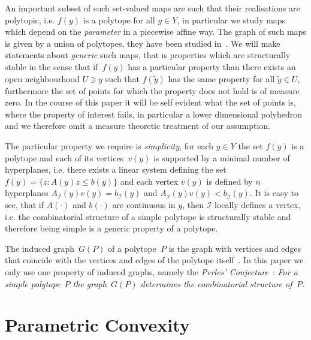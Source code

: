 \documentclass{elsarticle}
\theoremstyle{remark}
\theoremstyle{definition}
\begin{document}
An important subset of such set-valued maps are such that their realisations are polytopic, i.e. $f(y)$ is a polytope for all $y\in Y$, in particular we study maps which depend on the \emph{parameter} in a piecewise affine way.
%
The graph of such maps is given by a union of polytopes, they have been studied in~\cite{Finzel:2000}.
%
We will make statements about \emph{generic} such maps, that is properties which are structurally stable in the sense that if~$f(y)$ has a particular property than there exists an open neighbourhood $U\ni y$ such that $f(\tilde y)$ has the same property for all $\tilde y\in U$, furthermore the set of points for which the property does not hold is of measure zero.
%
In the course of this paper it will be self evident what the set of points is, where the property of interest fails, in particular a lower dimensional polyhedron and we therefore omit a measure theoretic treatment of our assumption.

The particular property we require is \emph{simplicity}, for each $y\in Y$ the set $f(y)$ is a polytope and each of its vertices~$v(y)$ is supported by a minimal number of hyperplanes, i.e. there exists a linear system defining the set~$f(y) = \{z:A(y)z\leq b(y)\}$ and each vertex $v(y)$ is defined by $n$ hyperplanes $A_{\mathcal I}(y)v(y)=b_{\mathcal I}(y)$ and $A_{\bar{\mathcal I}}(y)v(y)<b_{\bar{\mathcal I}}(y)$.
%
It is easy to see, that if $A(\cdot)$ and $b(\cdot)$ are continuous in $y$, then $\mathcal I$ locally defines a vertex, i.e. the combinatorial structure of a simple polytope is structurally stable and therefore being simple is a generic property of a polytope.


The induced graph~$G(P)$ of a polytope~$P$ is the graph with vertices and edges that coincide with the vertices and edges of the polytope itself~\cite{Bondy:2008}.
%
In this paper we only use one property of induced graphs, namely the \emph{Perles' Conjecture}~\cite{Kalai:1988}:
\emph{For a simple polytope~$P$ the graph~$G(P)$ determines the combinatorial structure of~$P$.}

\section{Parametric Convexity}\label{sec:parametric:convexity}
\end{document}
